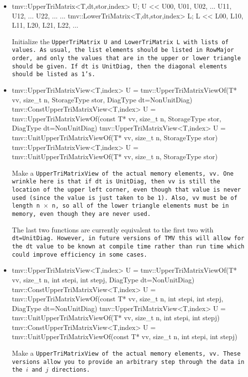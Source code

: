 \begin{itemize}
\vspace{1 in}
\item
\begin{tmvcode}
tmv::UpperTriMatrix<T,dt,stor,index> U;
U << U00, U01, U02, ...
          U11, U12, ...
               U22, ...
                    ...
tmv::LowerTriMatrix<T,dt,stor,index> L;
L << L00,
     L10, L11, 
     L20, L21, L22,
     ...
\end{tmvcode}
Initialize the \tt{UpperTriMatrix U} and \tt{LowerTriMatrix L} with lists of values.  As usual, the 
list elements should be listed in RowMajor order, and only the values that are in the upper or
lower triangle should be given.  If \tt{dt} is \tt{UnitDiag}, then the diagonal elements should be 
listed as 1's.
\item
\begin{tmvcode}
tmv::UpperTriMatrixView<T,index> U = 
      tmv::UpperTriMatrixViewOf(T* vv, size_t n, 
      StorageType stor, DiagType dt=NonUnitDiag)
tmv::ConstUpperTriMatrixView<T,index> U = 
      tmv::UpperTriMatrixViewOf(const T* vv, size_t n, 
      StorageType stor, DiagType dt=NonUnitDiag)
tmv::UpperTriMatrixView<T,index> U = 
      tmv::UnitUpperTriMatrixViewOf(T* vv, size_t n, 
      StorageType stor)
tmv::UpperTriMatrixView<T,index> U = 
      tmv::UnitUpperTriMatrixViewOf(T* vv, size_t n, 
      StorageType stor)
\end{tmvcode}
Make a \tt{UpperTriMatrixView} of the actual memory elements, \tt{vv}.
One wrinkle here is that if \tt{dt} is \tt{UnitDiag}, then 
\tt{vv} is still the location of the
upper left corner, even though that value is never used 
(since the value is just taken to
be 1).  Also, \tt{vv} must be of length \tt{n} $\times$ \tt{n},
so all of the lower triangle
elements must be in memory, even though they are never used.

The last two functions are currently equivalent to the first two with \tt{dt=UnitDiag}.
However, in future versions of TMV this will allow for the \tt{dt} value to be 
known at compile time rather than run time which could improve efficiency
in some cases.

\item
\begin{tmvcode}
tmv::UpperTriMatrixView<T,index> U = 
      tmv::UpperTriMatrixViewOf(T* vv, size_t n, 
      int stepi, int stepj, DiagType dt=NonUnitDiag)
tmv::ConstUpperTriMatrixView<T,index> U = 
      tmv::UpperTriMatrixViewOf(const T* vv, size_t n, 
      int stepi, int stepj, DiagType dt=NonUnitDiag)
tmv::UpperTriMatrixView<T,index> U = 
      tmv::UnitUpperTriMatrixViewOf(T* vv, size_t n, 
      int stepi, int stepj)
tmv::ConstUpperTriMatrixView<T,index> U = 
      tmv::UnitUpperTriMatrixViewOf(const T* vv, size_t n, 
      int stepi, int stepj)
\end{tmvcode}
Make a \tt{UpperTriMatrixView} of the actual memory elements, \tt{vv}.
These versions allow you to provide an arbitrary step through the data in 
the $i$ and $j$ directions. 
\end{itemize}


